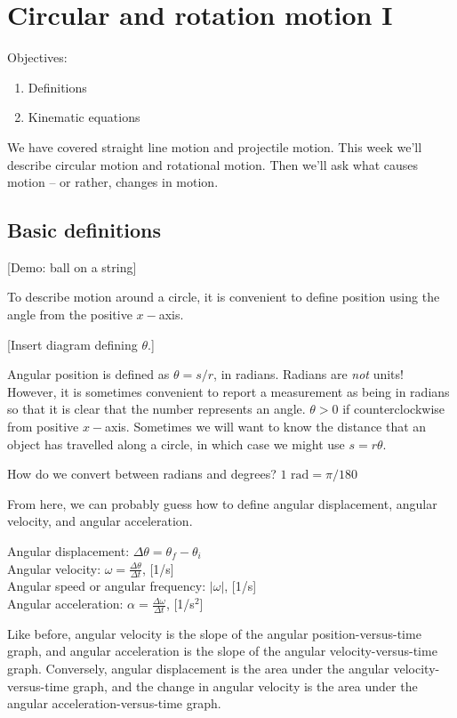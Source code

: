 \section{Circular and rotation motion I}
Objectives:
\begin{enumerate}
\item Definitions
\item Kinematic equations
\end{enumerate}

We have covered straight line motion and projectile motion. This week we'll describe circular motion and rotational motion. Then we'll ask what causes motion -- or rather, changes in motion.

\subsection{Basic definitions}
[Demo: ball on a string]

To describe motion around a circle, it is convenient to define position using the angle from the positive $x-$axis.

[Insert diagram defining $\theta$.]
\vspace{5cm}

Angular position is defined as $\theta=s/r$, in radians. Radians are \textit{not} units! However, it is sometimes convenient to report a measurement as being in radians so that it is clear that the number represents an angle. $\theta>0$ if counterclockwise from positive $x-$axis. Sometimes we will want to know the distance that an object has travelled along a circle, in which case we might use $s=r\theta$.

How do we convert between radians and degrees? $1\mbox{ rad}=\pi/180$

From here, we can probably guess how to define angular displacement, angular velocity, and angular acceleration.

Angular displacement: $\Delta{\theta}=\theta_f-\theta_i$\\
Angular velocity: $\omega=\frac{\Delta\theta}{\Delta{t}}$, [1/s]\\
Angular speed or angular frequency: $|\omega|$, [1/s]\\
Angular acceleration: $\alpha=\frac{\Delta\omega}{\Delta{t}}$, [1/s$^2$]

Like before, angular velocity is the slope of the angular position-versus-time graph, and angular acceleration is the slope of the angular velocity-versus-time graph. Conversely, angular displacement is the area under the angular velocity-versus-time graph, and the change in angular velocity is the area under the angular acceleration-versus-time graph. 

